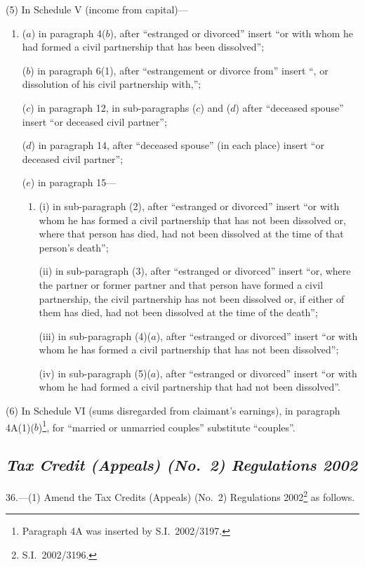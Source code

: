 \documentclass[12pt,a4paper]{article}
\begin{document}
(5) In Schedule V (income from capital)—
\begin{enumerate}\item[]
($a$) in paragraph 4($b$), after “estranged or divorced” insert “or with whom he had formed a civil partnership that has been dissolved”;

($b$) in paragraph 6(1), after “estrangement or divorce from” insert “, or dissolution of his civil partnership with,”;

($c$) in paragraph 12, in sub-paragraphs ($c$)  and ($d$)  after “deceased spouse” insert “or deceased civil partner”;

($d$) in paragraph 14, after “deceased spouse” (in each place) insert “or deceased civil partner”;

($e$) in paragraph 15—
\begin{enumerate}\item[]
(i) in sub-paragraph (2), after “estranged or divorced” insert “or with whom he has formed a civil partnership that has not been dissolved or, where that person has died, had not been dissolved at the time of that person’s death”;

(ii) in sub-paragraph (3), after “estranged or divorced” insert “or, where the partner or former partner and that person have formed a civil partnership, the civil partnership has not been dissolved or, if either of them has died, had not been dissolved at the time of the death”;

(iii) in sub-paragraph (4)($a$), after “estranged or divorced” insert “or with whom he has formed a civil partnership that has not been dissolved”;

(iv) in sub-paragraph (5)($a$), after “estranged or divorced” insert “or with whom he had formed a civil partnership that had not been dissolved”.
\end{enumerate}
\end{enumerate}

(6) In Schedule VI (sums disregarded from claimant’s earnings), in paragraph 4A(1)($b$)\footnote{Paragraph 4A was inserted by S.I.\ 2002/3197.}, for “married or unmarried couples” substitute “couples”.

\subsection*{\itshape Tax Credit (Appeals) (No.\ 2) Regulations 2002}

36.---(1)  Amend the Tax Credits (Appeals) (No.\ 2) Regulations 2002\footnote{S.I.\ 2002/3196.} as follows.
\end{document}
